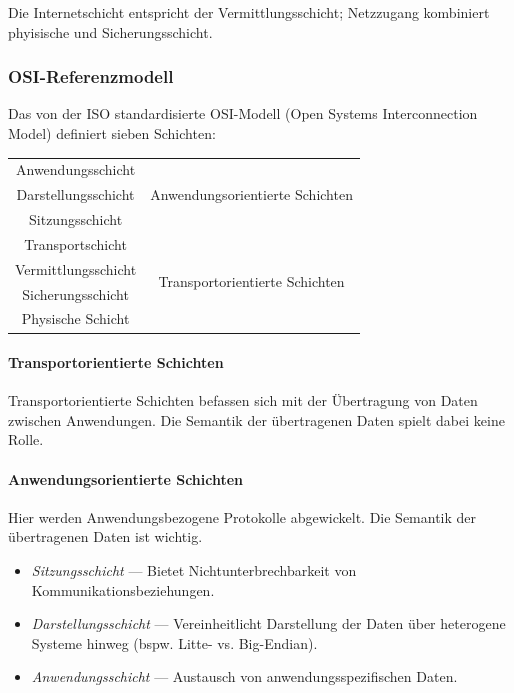\documentclass[a4paper, 14pt]{article}
\begin{document}
	Die Internetschicht entspricht der Vermittlungsschicht; Netzzugang kombiniert phyisische und Sicherungsschicht.
	
	\subsubsection{OSI-Referenzmodell}

	Das von der ISO standardisierte OSI-Modell (Open Systems Interconnection Model) definiert sieben Schichten:

	\begin{center}
		\Large
		\begin{tabular}{| c | c}
			\cline{1-1}
			Anwendungsschicht & \multirow{3}{*}{\normalsize Anwendungsorientierte Schichten} \\
			\cline{1-1}
			Darstellungsschicht & \\
			\cline{1-1}
			Sitzungsschicht & \\
			\hline
			Transportschicht & \multirow{4}{*}{\normalsize Transportorientierte Schichten} \\
			\cline{1-1}
			Vermittlungsschicht & \\
			\cline{1-1}
			Sicherungsschicht & \\
			\cline{1-1}
			Physische Schicht & \\
			\cline{1-1}
		\end{tabular}
	\end{center}

	\paragraph{Transportorientierte Schichten}

	Transportorientierte Schichten befassen sich mit der Übertragung von Daten zwischen Anwendungen.
	Die Semantik der übertragenen Daten spielt dabei keine Rolle.

	\paragraph{Anwendungsorientierte Schichten}

	Hier werden Anwendungsbezogene Protokolle abgewickelt.
	Die Semantik der übertragenen Daten ist wichtig.

	\begin{itemize}
		\item \emph{Sitzungsschicht} --- Bietet Nichtunterbrechbarkeit von Kommunikationsbeziehungen.
		\item \emph{Darstellungsschicht} --- Vereinheitlicht Darstellung der Daten über heterogene Systeme hinweg (bspw. Litte- vs. Big-Endian).
		\item \emph{Anwendungsschicht} --- Austausch von anwendungsspezifischen Daten.
	\end{itemize}
\end{document}
